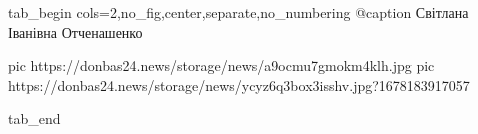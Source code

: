  
 
 
 
 

\ifcmt
  tab_begin cols=2,no_fig,center,separate,no_numbering
		 @caption Світлана Іванівна Отченашенко

     pic https://donbas24.news/storage/news/a9ocmu7gmokm4klh.jpg
		 pic https://donbas24.news/storage/news/ycyz6q3box3isshv.jpg?1678183917057

  tab_end
\fi
